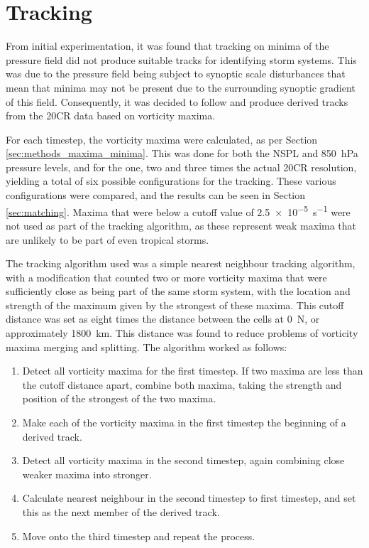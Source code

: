 \documentclass[pdftex,12pt,a4paper]{report}
\begin{document}
\section{Tracking}
\label{sec:tracking}

From initial experimentation, it was found that tracking on minima of the pressure field did not
produce suitable tracks for identifying storm systems. This was due to the pressure field being
subject to synoptic scale disturbances that mean that minima may not be present due to the
surrounding synoptic gradient of this field. Consequently, it was decided to follow
\textcite{reed1988evaluation, thorncroft2001african} and produce derived tracks from the 20CR data
based on vorticity maxima.

For each timestep, the vorticity maxima were calculated, as per Section
\ref{sec:methods_maxima_minima}. This was done for both the NSPL and \SI{850}{hPa} pressure
levels, and for the one, two and three times the actual 20CR resolution, yielding a total of six
possible configurations for the tracking. These various configurations were compared, and the
results can be seen in Section \ref{sec:matching}. Maxima that were below a cutoff value
of \SI{2.5e-5}{s^{-1}} were not used as part of the tracking algorithm, as these represent weak maxima
that are unlikely to be part of even tropical storms. 


The tracking algorithm used was a simple nearest neighbour tracking algorithm, with a modification
that counted two or more vorticity maxima that were sufficiently close as being part of the same storm
system, with the location and strength of the maximum given by the strongest of
these maxima. This cutoff distance was set as eight times the distance between the cells at
0\textdegree\ N, or approximately \SI{1800}{km}. This distance was found to reduce problems of
vorticity maxima merging and splitting. The algorithm worked as follows:

\begin{enumerate}
    \item Detect all vorticity maxima for the first timestep. If two maxima are less than the cutoff
        distance apart, combine both maxima, taking the strength and position of the strongest of
        the two maxima.
    \item Make each of the vorticity maxima in the first timestep the beginning of a derived track.
    \item Detect all vorticity maxima in the second timestep, again combining close weaker maxima
        into stronger. 
    \item Calculate nearest neighbour in the second timestep to first timestep, and set this as the
        next member of the derived track.
    \item Move onto the third timestep and repeat the process.
\end{enumerate}
\end{document}
